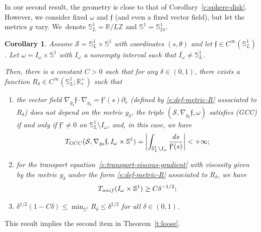 \documentclass[11pt]{article}
\numberwithin{equation}{section}
\newcommand{\GCC}{\textup{GCC}}
\newcommand{\pGCC}{\textup{(GCC)}\xspace}
\newcommand{\unif}{\textup{unif}}
\newtheorem{corollary}[lemma]{Corollary}
\theoremstyle{definition}
\newcommand{\calS}{\ensuremath{\mathcal S}}
\newcommand{\mb}[1]{\ensuremath{\mathbb{#1}}}
\newcommand{\R}{{\mb{R}}}
\newcommand{\bS}{\ensuremath{\mathbb S}}
\newcommand{\Z}{\mathbb Z}
\newcommand{\f}{\ensuremath{\mathfrak{f}}}
\let\d\partial
\let\ovl\overline
\begin{document}
In our second result, the geometry is close to that of Corollary~\ref{c:sphere-disk}. However, we consider fixed $\omega$ and $\f$ (and even a fixed vector field), but let the metrics $g$ vary.
We~denote $\bS^1_L = \R/L\Z$ and $\bS^1 =\bS^1_{2\pi}$.
\begin{corollary}
\label{c:example-torus}
Assume $\calS=\bS^1_L \times \bS^1$ with coordinates $(s,\theta)$ and let $\f\in C^{\infty}(\bS^1_L)$.
Let $\omega = I_\omega \times \bS^1$ with $I_\omega$ a nonempty interval such that $\ovl{I_\omega} \neq \bS^1_L$.

Then, there is a constant $C>0$ such that for any $\delta \in (0,1)$, there exists a function $R_\delta \in C^\infty(\bS^1_L ;\R^+_*)$ such that
\begin{enumerate}
\item the vector field $\nabla_{g_\delta}\f \cdot \nabla_{g_\delta}= \f'(s) \d_s$ (defined by \eqref{e:def-metric-R} associated to $R_\delta$) does not depend on the metric $g_\delta$, the triple $(\calS,\nabla_{g_\delta}\f,\omega)$ satisfies \pGCC if and only if $\f'\neq 0$ on $\bS^1_L \setminus I_\omega$, and, in this case, we have\vspace*{-3pt}
\[
T_{\GCC}(\calS, \nabla_{g_\delta}\f,I_\omega \times \bS^1) = \biggl| \int_{\bS^1_L \setminus I_\omega} \frac{ds}{\f'(s)} \biggr| < +\infty;
\]
\item for the transport equation~\eqref{e:transport-viscous-gradient} with viscosity given by the metric $g_\delta$ under the form \eqref{e:def-metric-R} associated to $R_\delta$, we have\vspace*{-3pt}
\[
T_{\unif}(I_\omega \times\bS^1) \geq C\delta^{-1/2};
\]
\item $\delta^{1/2} (1-C\delta) \leq \min_{\bS^1}R_\delta \leq \delta^{1/2}$ for all $\delta \in (0,1)$.
\end{enumerate}
\end{corollary}
This result implies the second item in Theorem~\ref{t:loose}.
\end{document}

